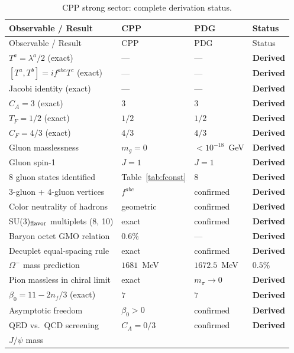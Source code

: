 \documentclass[11pt,letterpaper]{article}
\begin{document}
\begin{longtable}{@{}p{5.5cm}p{2.5cm}p{2.5cm}l@{}}
\caption{CPP strong sector: complete derivation status.}
\label{tab:status}\\
\toprule
Observable / Result & CPP & PDG & Status \\
\midrule
\endfirsthead
\toprule
Observable / Result & CPP & PDG & Status \\
\midrule
\endhead
\bottomrule
\endfoot
$T^a = \lambda^a/2$ (exact)
  & --- & --- & \textbf{Derived} \\
$[T^a,T^b]=if^{abc}T^c$ (exact)
  & --- & --- & \textbf{Derived} \\
Jacobi identity (exact)
  & --- & --- & \textbf{Derived} \\
$C_A = 3$ (exact)
  & $3$ & $3$ & \textbf{Derived} \\
$T_F = 1/2$ (exact)
  & $1/2$ & $1/2$ & \textbf{Derived} \\
$C_F = 4/3$ (exact)
  & $4/3$ & $4/3$ & \textbf{Derived} \\
Gluon masslessness
  & $m_g=0$ & $<10^{-18}$~GeV & \textbf{Derived} \\
Gluon spin-1
  & $J=1$ & $J=1$ & \textbf{Derived} \\
8 gluon states identified
  & Table~\ref{tab:fconst} & 8 & \textbf{Derived} \\
3-gluon + 4-gluon vertices
  & $f^{abc}$ & confirmed & \textbf{Derived} \\
Color neutrality of hadrons
  & geometric & confirmed & \textbf{Derived} \\
SU(3)$_{\rm flavor}$ multiplets (8, 10)
  & exact & confirmed & \textbf{Derived} \\
Baryon octet GMO relation
  & $0.6\%$ & --- & \textbf{Derived} \\
Decuplet equal-spacing rule
  & exact & confirmed & \textbf{Derived} \\
$\Omega^-$ mass prediction
  & $1681$~MeV & $1672.5$~MeV & $0.5\%$ \\
Pion massless in chiral limit
  & exact & $m_\pi\to0$ & \textbf{Derived} \\
$\beta_0 = 11-2n_f/3$ (exact)
  & $7$ & $7$ & \textbf{Derived} \\
Asymptotic freedom
  & $\beta_0>0$ & confirmed & \textbf{Derived} \\
QED vs.\ QCD screening
  & $C_A=0/3$ & confirmed & \textbf{Derived} \\
$J/\psi$ mass

\end{longtable}
\end{document}
